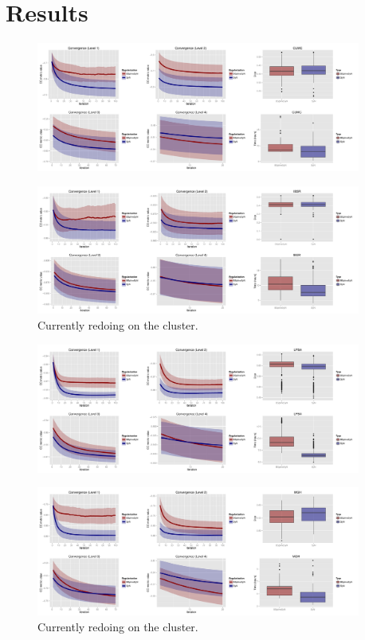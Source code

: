 \documentclass{frontiersSCNS}
\begin{document}
\section{Results}

\begin{figure}[htb]
  \centering
  \includegraphics[width=0.95\textwidth]{allCUMC.pdf}
  \caption{}
\end{figure}

\begin{figure}[htb]
  \centering
  \includegraphics[width=0.95\textwidth]{allIBSR.pdf}
  \caption{Currently redoing on the cluster.}
\end{figure}

\begin{figure}[htb]
  \centering
  \includegraphics[width=0.95\textwidth]{allLPBA.pdf}
  \caption{}
\end{figure}

\begin{figure}[htb]
  \centering
  \includegraphics[width=0.95\textwidth]{allMGH.pdf}
  \caption{Currently redoing on the cluster.}
\end{figure}
\end{document}
